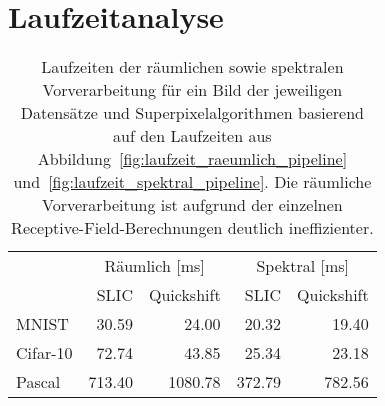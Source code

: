 \section{Laufzeitanalyse}
\label{laufzeitanalyse}





\begin{table}[t]
\centering
\begin{tabular}{lrrrr}
  \toprule
  & \multicolumn{2}{c}{Räumlich [ms]} & \multicolumn{2}{c}{Spektral [ms]}\\
  \cmidrule{2-5}
  & \gls{SLIC} & Quickshift & \acs{SLIC} & Quickshift\\
  \midrule
  \acs{MNIST} & 30.59 & 24.00 & 20.32 & 19.40\\
  \acs{Cifar}-10 & 72.74 & 43.85 & 25.34 & 23.18\\
  \acs{Pascal} & 713.40 & 1080.78 & 372.79 & 782.56\\
  \bottomrule
\end{tabular}
\caption[Laufzeiten der räumlichen und spektralen Vorverarbeitung]{Laufzeiten der räumlichen sowie spektralen Vorverarbeitung für ein Bild der jeweiligen Datensätze und Superpixelalgorithmen basierend auf den Laufzeiten aus Abbildung~\ref{fig:laufzeit_raeumlich_pipeline} und~\ref{fig:laufzeit_spektral_pipeline}.
Die räumliche Vorverarbeitung ist aufgrund der einzelnen Receptive-Field-Berechnungen deutlich ineffizienter.}
\label{tab:laufzeit_raeumlich_spektral}
\end{table}


